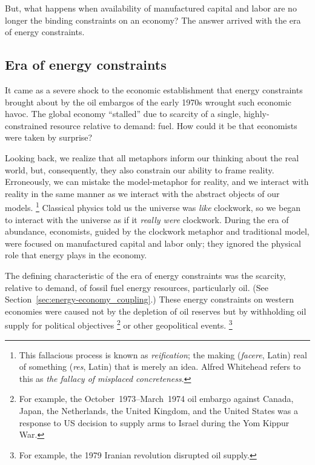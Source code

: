 But, what happens when availability of manufactured capital and labor are no longer
the binding constraints on an economy?
The answer arrived with the era of energy constraints.


\subsection{Era of energy constraints}
\label{sec:era_of_energy_constraints}

It came as a severe shock to the economic establishment
that energy constraints brought about by the oil embargos of the early 1970s
wrought such economic havoc.\cite[p.~3]{ayres1997}
The global economy
``stalled'' due to scarcity of 
a single, highly-constrained resource relative to demand:
fuel.
How could it be that economists were taken by surprise?

Looking back, we realize that 
all metaphors inform our thinking about the real world,
but, consequently,
they also constrain our ability to frame reality.
Erroneously, we can mistake the model-metaphor for reality, and
we interact with reality in the same manner 
as we interact with the abstract objects of our
models.%
	\footnote{
	This fallacious process is known as
	\emph{reification}; the making (\emph{facere}, Latin) real of
	something (\emph{res}, Latin) that is merely an idea.
	Alfred Whitehead refers to this as
	\emph{the fallacy of misplaced concreteness}.\cite{Whitehead2011}
	}
Classical physics told us the universe was
\emph{like} clockwork, 
so we began to interact with the universe
as if it \emph{really were} clockwork.
During the era of abundance, 
economists, guided by the clockwork metaphor and traditional model,
were focused on manufactured capital and labor only;
they ignored the physical role that energy plays in the economy.

The defining characteristic of the era of energy constraints
was the scarcity, relative to demand, of fossil fuel energy resources, particularly oil.
(See Section~\ref{sec:energy-economy_coupling}.)
These energy constraints on western economies were caused
not by the depletion of oil reserves
but by withholding oil supply for political objectives%
	\footnote{
	For example,
	the October~1973--March~1974 oil embargo against 
	Canada, 
	Japan, 
	the Netherlands, 
	the United Kingdom, and 
	the United States 
	was a response to US decision to supply arms to Israel
	during the Yom Kippur War.
	}
or other geopolitical events.%
	\footnote{
	For example, 
	the 1979 Iranian revolution disrupted oil supply.
	}

